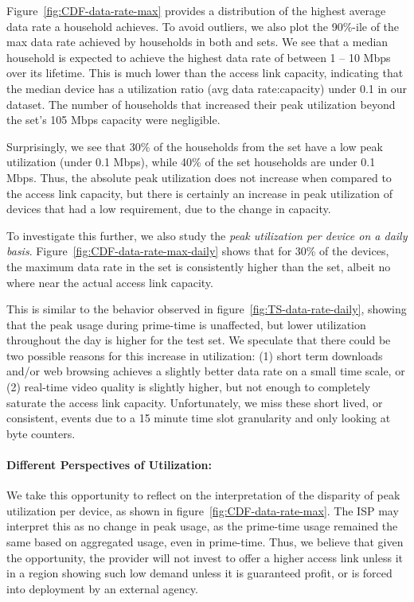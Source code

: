 Figure~\ref{fig:CDF-data-rate-max} provides a distribution of the highest average
data rate a household achieves. To avoid outliers, we also plot the 90\%-ile of the max
data rate achieved by households in both \test and \control sets. We see that a median
household is expected to achieve the highest data rate of between 1 -- 10 Mbps over its
lifetime. This is much lower than the access link capacity,
indicating that the median device has a utilization ratio (avg data rate:capacity) under
0.1 in our dataset. The number of households that increased their peak utilization beyond
the \control set's 105 Mbps capacity were negligible.

Surprisingly, we see that 30\% of the households from the \test set have a low peak
utilization (under 0.1 Mbps), while 40\% of the \control set households are under 0.1 Mbps.
Thus, the absolute peak utilization does not increase when compared to the access link
capacity, but there is certainly an increase in peak utilization of devices that had a low
requirement, due to the change in capacity.

To investigate this further, we also study the \emph{peak utilization per device on a daily basis}.
Figure~\ref{fig:CDF-data-rate-max-daily} shows that for 30\% of the devices,
the maximum data rate in the \test set is consistently higher than the \control set, albeit
no where near the actual access link capacity.

This is similar to the behavior observed in figure~\ref{fig:TS-data-rate-daily}, showing that the peak
usage during prime-time is unaffected, but lower utilization throughout the day is higher
for the test set. We speculate that there could be two possible reasons for this increase
in utilization: (1) short term downloads and/or web browsing achieves a slightly better
data rate on a small time scale, or (2) real-time video quality is slightly higher, but
not enough to completely saturate the access link capacity. Unfortunately, we miss these
short lived, or consistent, events due to a 15 minute time slot granularity and only
looking at byte counters.


\paragraph{Different Perspectives of Utilization: }
We take this opportunity to reflect on the
interpretation of the disparity of peak utilization per device, as shown in
figure~\ref{fig:CDF-data-rate-max}. The ISP may interpret this as no change in peak usage, as
the prime-time usage remained the same based on aggregated usage, even in prime-time. Thus, we
believe that given the opportunity, the provider will not invest to offer a higher access
link unless it in a region showing such low demand unless it is guaranteed profit, or is forced
into deployment by an external agency.

